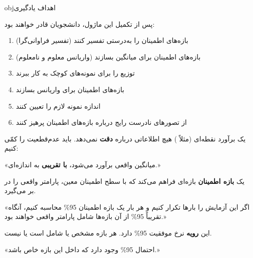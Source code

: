 \begin{PSbox}[unbreakable]{obj}{اهداف یادگیری}

پس از تکمیل این ماژول، دانشجویان قادر خواهند بود:

\begin{enumerate}
\def\labelenumi{\arabic{enumi}.}
\tightlist
\item
  بازه‌های اطمینان را به‌درستی تفسیر کنند (تفسیر فراوانی‌گرا)
\item
  بازه‌های اطمینان برای میانگین بسازند (واریانس معلوم و نامعلوم)
\item
  توزیع  را برای نمونه‌های کوچک به کار ببرند
\item
  بازه‌های اطمینان برای واریانس بسازند
\item
  اندازه نمونه لازم را تعیین کنند
\item
  از تصورهای نادرست رایج درباره بازه‌های اطمینان پرهیز کنند
\end{enumerate}

\end{PSbox}


یک برآورد نقطه‌ای (مثلاً ) هیچ اطلاعاتی درباره \textbf{دقت} نمی‌دهد. باید عدم‌قطعیت را کمّی کنیم:

«میانگین واقعی  برآورد می‌شود، \textbf{با تقریبی} به اندازه‌ای.»

یک \textbf{بازه اطمینان} بازه‌ای فراهم می‌کند که با سطح اطمینان معین، پارامتر واقعی را در بر می‌گیرد.



\begin{PSquote}

«اگر این آزمایش را بارها تکرار کنیم و هر بار یک بازه اطمینان 95\% محاسبه کنیم، آنگاه تقریباً 95\% از آن بازه‌ها شامل پارامتر واقعی \lr{$\mu$} خواهند بود.»

\end{PSquote}

این \textbf{رویه} نرخ موفقیت 95\% دارد. هر بازه مشخص یا شامل \lr{$\mu$} است یا نیست.


\begin{PSquote}

{«احتمال 95\% وجود دارد که \lr{$\mu$} داخل این بازه خاص \lr{\mbox{[2.1, 4.8]}} باشد.»}

\end{PSquote}

